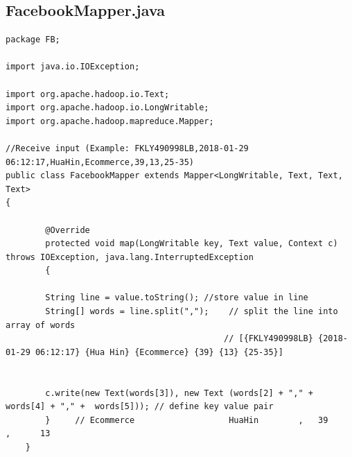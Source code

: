 \documentclass[11pt]{article}
\begin{document}
\subsection*{FacebookMapper.java}
\begin{lstlisting}
package FB;

import java.io.IOException;

import org.apache.hadoop.io.Text;
import org.apache.hadoop.io.LongWritable;
import org.apache.hadoop.mapreduce.Mapper;

//Receive input (Example: FKLY490998LB,2018-01-29 06:12:17,HuaHin,Ecommerce,39,13,25-35)
public class FacebookMapper extends Mapper<LongWritable, Text, Text, Text>
{
	 
	    @Override
	    protected void map(LongWritable key, Text value, Context c)	throws IOException, java.lang.InterruptedException
	    {

		String line = value.toString(); //store value in line
		String[] words = line.split(",");    // split the line into array of words
										    // [{FKLY490998LB} {2018-01-29 06:12:17} {Hua Hin} {Ecommerce} {39} {13} {25-35}]

		
		c.write(new Text(words[3]), new Text (words[2] + "," + words[4] + "," +  words[5])); // define key value pair
	    }     // Ecommerce                   HuaHin        ,   39          ,      13  
	}
\end{lstlisting}


\newpage
\end{document}
